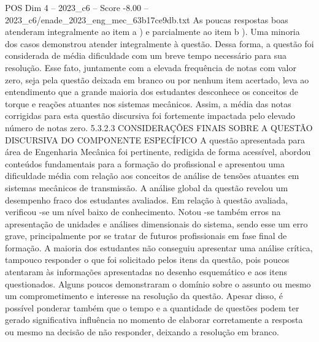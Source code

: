 \begin{textsample}{POS Dim 4 – 2023\_c6 – Score -8.00 – 2023\_c6/enade\_2023\_eng\_mec\_63b17ce9db.txt}
As poucas respostas boas atenderam integralmente ao item a ) e parcialmente ao item b ).
Uma minoria dos casos demonstrou atender integralmente à questão.
Dessa forma, a questão foi considerada de média dificuldade com um breve tempo necessário para sua resolução.
Esse fato, juntamente com a elevada frequência de notas com valor zero, seja pela questão deixada em branco ou por nenhum item acertado, leva ao entendimento que a grande maioria dos estudantes desconhece os conceitos de torque e reações atuantes nos sistemas mecânicos.
Assim, a média das notas corrigidas para esta questão discursiva foi fortemente impactada pelo elevado número de notas zero. 5.3.2.3 CONSIDERAÇÕES FINAIS SOBRE A QUESTÃO DISCURSIVA DO COMPONENTE ESPECÍFICO A questão apresentada para área de Engenharia Mecânica foi pertinente, redigida de forma acessível, abordou conteúdos fundamentais para a formação do profissional e apresentou uma dificuldade média com relação aos conceitos de análise de tensões atuantes em sistemas mecânicos de transmissão.
A análise global da questão revelou um desempenho fraco dos estudantes avaliados.
Em relação à questão avaliada, verificou -se um nível baixo de conhecimento.
Notou -se também erros na apresentação de unidades e análises dimensionais do sistema, sendo esse um erro grave, principalmente por se tratar de futuros profissionais em fase final de formação.
A maioria dos estudantes não conseguiu apresentar uma análise crítica, tampouco responder o que foi solicitado pelos itens da questão, pois poucos atentaram às informações apresentadas no desenho esquemático e aos itens questionados.
Alguns poucos demonstraram o domínio sobre o assunto ou mesmo um comprometimento e interesse na resolução da questão.
Apesar disso, é possível ponderar também que o tempo e a quantidade de questões podem ter gerado significativa influência no momento de elaborar corretamente a resposta ou mesmo na decisão de não responder, deixando a resolução em branco.

\end{textsample}
